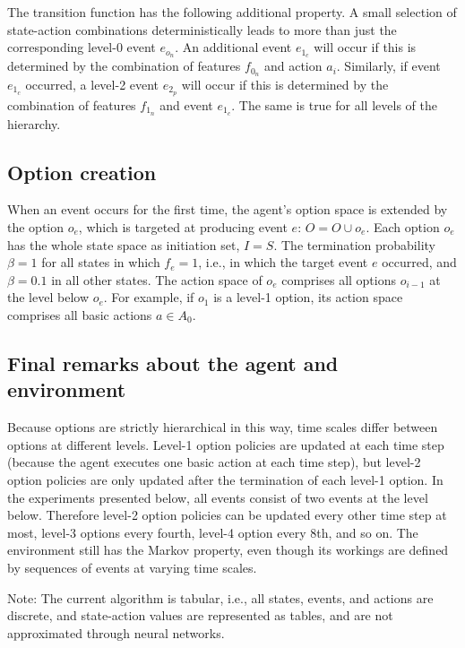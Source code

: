 \documentclass{article}
\begin{document}
The transition function has the following additional property. A small selection of state-action combinations deterministically leads to more than just the corresponding level-0 event $e_{o_n}$. An additional event $e_{1_c}$ will occur if this is determined by the combination of features $f_{0_n}$ and action $a_i$. Similarly, if event $e_{1_c}$ occurred, a level-2 event $e_{2_p}$ will occur if this is determined by the combination of features $f_{1_n}$ and event $e_{1_c}$. The same is true for all levels of the hierarchy. 

\subsection{Option creation}

When an event occurs for the first time, the agent's option space is extended by the option $o_e$, which is targeted at producing event $e$: $O = O \cup o_e$. Each option $o_e$ has the whole state space as initiation set, $I = S$. The termination probability $\beta = 1$ for all states in which $f_e = 1$, i.e., in which the target event $e$ occurred, and $\beta = 0.1$ in all other states. The action space of $o_e$ comprises all options $o_{i-1}$ at the level below $o_e$. For example, if $o_1$ is a level-1 option, its action space comprises all basic actions $a \in A_0$. 

\subsection{Final remarks about the agent and environment}

Because options are strictly hierarchical in this way, time scales differ between options at different levels. Level-1 option policies are updated at each time step (because the agent executes one basic action at each time step), but level-2 option policies are only updated after the termination of each level-1 option. In the experiments presented below, all events consist of two events at the level below. Therefore level-2 option policies can be updated every other time step at most, level-3 options every fourth, level-4 option every 8th, and so on. The environment still has the Markov property, even though its workings are defined by sequences of events at varying time scales. 

Note: The current algorithm is tabular, i.e., all states, events, and actions are discrete, and state-action values are represented as tables, and are not approximated through neural networks.
\end{document}
